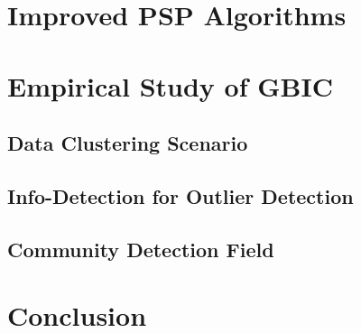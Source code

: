 \section{Improved PSP Algorithms}\label{sec:alg}
\section{Empirical Study of GBIC}\label{sec:es}
\subsection{Data Clustering Scenario}\label{subsec:dc}
\subsection{Info-Detection for Outlier Detection}\label{subsec:od}
\subsection{Community Detection Field}\label{subsec:cd}
\section{Conclusion}\label{sec:conc}



%
%



%
%



